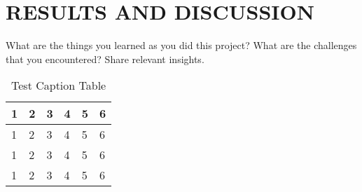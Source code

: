 
\section{RESULTS AND DISCUSSION}
    What are the things you learned as you did this project? What are the challenges that you encountered? Share relevant insights. 
    \lipsum[4]

    \begin{table}[ht]
    \vspace{4ex}
    \centering
        \caption{Test Caption Table}   
        \label{table:Test Caption Table}
        \begin{tabular}{llllll}
        \hline
        \hline
        1 & 2 & 3 & 4 & 5 & 6 \\ \hline
        1 & 2 & 3 & 4 & 5 & 6 \\
        1 & 2 & 3 & 4 & 5 & 6 \\
        1 & 2 & 3 & 4 & 5 & 6 \\ \hline\hline
        \end{tabular} 
    \vspace{4ex}
    \end{table}
    
    \lipsum[8-10]
    \lipsum[5]